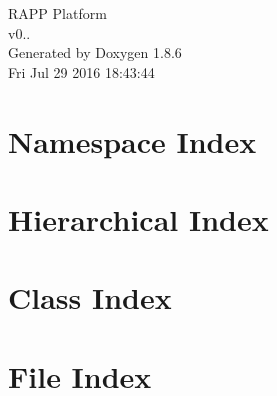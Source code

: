 \documentclass[twoside]{book}
\newcommand{\clearemptydoublepage}{%
  \newpage{\pagestyle{empty}\cleardoublepage}%
}
\begin{document}
\hypersetup{pageanchor=false}
\begin{titlepage}
\vspace*{7cm}
\begin{center}%
{\Large R\-A\-P\-P Platform \\[1ex]\large v0.. }\\
\vspace*{1cm}
{\large Generated by Doxygen 1.8.6}\\
\vspace*{0.5cm}
{\small Fri Jul 29 2016 18:43:44}\\
\end{center}
\end{titlepage}
\clearemptydoublepage
\tableofcontents
\clearemptydoublepage
{}
\hypersetup{pageanchor=true}

\chapter{Namespace Index}

\chapter{Hierarchical Index}

\chapter{Class Index}

\chapter{File Index}

\end{document}
